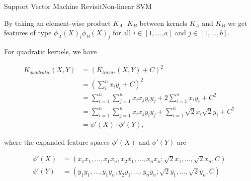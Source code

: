\documentclass[first=dgreen,second=purple,logo=yellowexc]{aaltoslides}
\begin{document}
\begin{frame}[allowframebreaks]{Support Vector Machine Revisit}{Non-linear SVM}
\begin{itemize}
\begin{itemize}
By taking an element-wise product $K_A \cdot K_B$ between kernels $K_A$ and $K_B$ we get features of type $\phi_A(X)_i \phi_B(X)_j$ for all $i \in [1,\ldots, a]$ and $j \in [1, \ldots, b]$.

For quadratic kernels, we have

\begin{align}
K_{quadratic}(X,Y) &= (K_{linear}(X,Y) + C)^2 \\
 &= \left( \sum_i^n x_i y_i + C \right)^2 \\
 &= \sum_{i=1}^n \sum_{j=1}^n x_i x_j y_i y_j + 2 \sum_{i=1}^n x_i y_i + C^2 \\
 &= \sum_{i=1}^n \sum_{j=1}^n x_i x_j y_i y_j + \sum_{i=1}^n \sqrt{2} x_i \sqrt{2} y_i + C^2 \\
 &= \phi'(X) \cdot \phi'(Y),
\end{align}

where the expanded feature spaces $\phi'(X)$ and $\phi'(Y)$ are

\begin{align}
\phi'(X) &= (x_1 x_1, \ldots, x_1 x_n, x_2 x_1, \ldots, x_n x_n; \sqrt{2} x_1, \ldots, \sqrt{2} x_n, C) \\
\phi'(Y) &= (y_1 y_1, \ldots, y_1 y_n, y_2 y_1, \ldots, y_n y_n; \sqrt{2} y_1, \ldots, \sqrt{2} y_n, C) 
\end{align}
\end{itemize}

\end{itemize}
\end{frame}
\end{document}
